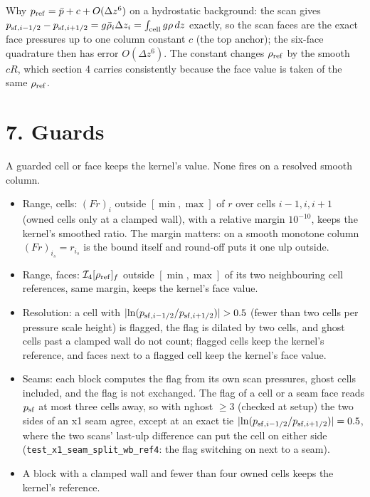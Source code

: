 \documentclass[11pt,a4paper]{article}
\begin{document}
Why $p_{\rm ref} = \bar p + c + O(\Delta z^6)$ on a hydrostatic background: the scan gives
$p_{{\rm sf},i-1/2} - p_{{\rm sf},i+1/2} = g\bar\rho_i\Delta z_i = \int_{\rm cell} g\rho\,dz$ exactly, so the scan
faces are the exact face pressures up to one column constant $c$ (the top anchor); the six-face quadrature
then has error $O(\Delta z^6)$. The constant changes $\rho_{\rm ref}$ by the smooth $cR$, which section 4
carries consistently because the face value is taken of the same $\rho_{\rm ref}$.

\section*{7. Guards}

A guarded cell or face keeps the kernel's value. None fires on a resolved smooth column.

\begin{itemize}
\item Range, cells: $(Fr)_i$ outside $[\min, \max]$ of $r$ over cells $i-1, i, i+1$ (owned cells only at a clamped
  wall), with a relative margin $10^{-10}$, keeps the kernel's smoothed ratio. The margin matters: on a smooth
  monotone column $(Fr)_{i_s} = r_{i_s}$ is the bound itself and round-off puts it one ulp outside.
\item Range, faces: $\mathcal I_4[\rho_{\rm ref}]_f$ outside $[\min, \max]$ of its two neighbouring cell references,
  same margin, keeps the kernel's face value.
\item Resolution: a cell with $\lvert\ln(p_{{\rm sf},i-1/2}/p_{{\rm sf},i+1/2})\rvert > 0.5$ (fewer than two cells per
  pressure scale height) is flagged, the flag is dilated by two cells, and ghost cells past a clamped wall do
  not count; flagged cells keep the kernel's reference, and faces next to a flagged cell keep the kernel's
  face value.
\item Seams: each block computes the flag from its own scan pressures, ghost cells included, and the flag is not
  exchanged. The flag of a cell or a seam face reads $p_{\rm sf}$ at most three cells away, so with nghost
  $\ge 3$ (checked at setup) the two sides of an x1 seam agree, except at an exact tie
  $\lvert\ln(p_{{\rm sf},i-1/2}/p_{{\rm sf},i+1/2})\rvert = 0.5$, where the two scans' last-ulp difference can
  put the cell on either side (\texttt{test\_x1\_seam\_split\_wb\_ref4}: the flag switching on next to a seam).
\item A block with a clamped wall and fewer than four owned cells keeps the kernel's reference.
\end{itemize}
\end{document}
